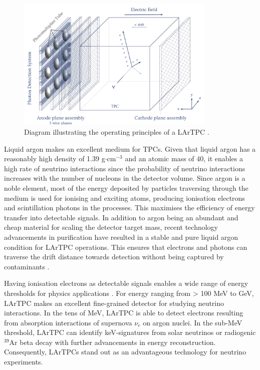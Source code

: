 \begin{figure}[ht!] 
\centering    
\includegraphics[width=0.85\textwidth]{LARTPC}
\caption[Liquid Argon Time Projection Chamber Diagram]{
Diagram illustrating the operating principles of a LArTPC \cite{RhiannonPhD}.
}
\label{fig:LARTPC}
\end{figure}

\newpage
Liquid argon makes an excellent medium for TPCs. %
Given that liquid argon has a reasonably high density of 1.39 g$\cdot$cm$^{-3}$ and an atomic mass of 40, it enables a high rate of neutrino interactions since the probability of neutrino interactions increases with the number of nucleons in the detector volume.
Since argon is a noble element, most of the energy deposited by particles traversing through the medium is used for ionising and exciting atoms, producing ionisation electrons and scintillation photons in the processes.
This maximises the efficiency of energy transfer into detectable signals.
In addition to argon being an abundant and cheap material for scaling the detector target mass, recent technology advancements in purification have resulted in a stable and pure liquid argon condition for LArTPC operations.
This ensures that electrons and photons can traverse the drift distance towards detection without being captured by contaminants \cite{ubooneEtime}.

Having ionisation electrons as detectable signals enables a wide range of energy thresholds for physics applications \cite{LEB_LARTPC}.
For energy ranging from > 100 MeV to GeV, LArTPC makes an excellent fine-grained detector for studying neutrino interactions.
In the tens of MeV, LArTPC is able to detect electrons resulting from absorption interactions of supernova $\nu_e$ on argon nuclei.
In the sub-MeV threshold, LArTPC can identify keV-signatures from solar neutrinos or radiogenic $^{39}$Ar beta decay with further advancements in energy reconstruction.
Consequently, LArTPCs stand out as an advantageous technology for neutrino experiments.

